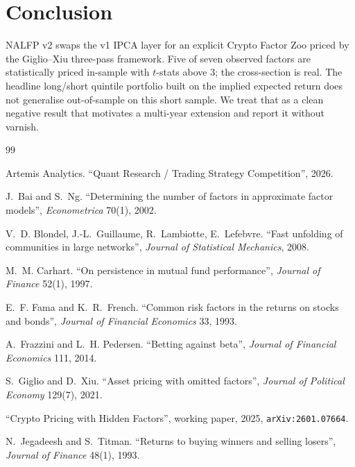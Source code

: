 \documentclass[11pt,a4paper]{article}
\begin{document}
\section{Conclusion}

NALFP v2 swaps the v1 IPCA layer for an explicit Crypto Factor Zoo priced by the Giglio--Xiu three-pass framework. Five of seven observed factors are statistically priced in-sample with $t$-stats above 3; the cross-section is real. The headline long/short quintile portfolio built on the implied expected return does not generalise out-of-sample on this short sample. We treat that as a clean negative result that motivates a multi-year extension and report it without varnish.

\begin{thebibliography}{99}

Artemis Analytics. ``Quant Research / Trading Strategy Competition'', 2026.

J.~Bai and S.~Ng. ``Determining the number of factors in approximate factor models'', \emph{Econometrica} 70(1), 2002.

V.~D. Blondel, J.-L.~Guillaume, R.~Lambiotte, E.~Lefebvre. ``Fast unfolding of communities in large networks'', \emph{Journal of Statistical Mechanics}, 2008.

M.~M. Carhart. ``On persistence in mutual fund performance'', \emph{Journal of Finance} 52(1), 1997.

E.~F. Fama and K.~R.~French. ``Common risk factors in the returns on stocks and bonds'', \emph{Journal of Financial Economics} 33, 1993.

A.~Frazzini and L.~H. Pedersen. ``Betting against beta'', \emph{Journal of Financial Economics} 111, 2014.

S.~Giglio and D.~Xiu. ``Asset pricing with omitted factors'', \emph{Journal of Political Economy} 129(7), 2021.

``Crypto Pricing with Hidden Factors'', working paper, 2025, \texttt{arXiv:2601.07664}.

N.~Jegadeesh and S.~Titman. ``Returns to buying winners and selling losers'', \emph{Journal of Finance} 48(1), 1993.


\end{thebibliography}
\end{document}
